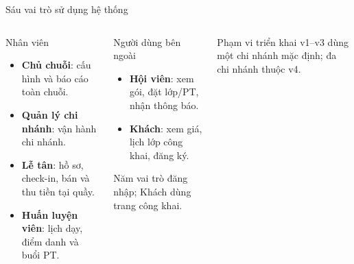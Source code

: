 \documentclass[aspectratio=169,10pt]{beamer}
\begin{document}
\begin{frame}{Sáu vai trò sử dụng hệ thống}
  \begin{columns}[T,onlytextwidth]
      \begin{block}{Nhân viên}
        \begin{itemize}
          \item \textbf{Chủ chuỗi}: cấu hình và báo cáo toàn chuỗi.
          \item \textbf{Quản lý chi nhánh}: vận hành chi nhánh.
          \item \textbf{Lễ tân}: hồ sơ, check-in, bán và thu tiền tại quầy.
          \item \textbf{Huấn luyện viên}: lịch dạy, điểm danh và buổi PT.
        \end{itemize}
      \end{block}
      \begin{block}{Người dùng bên ngoài}
        \begin{itemize}
          \item \textbf{Hội viên}: xem gói, đặt lớp/PT, nhận thông báo.
          \item \textbf{Khách}: xem giá, lịch lớp công khai, đăng ký.
        \end{itemize}
        Năm vai trò đăng nhập; Khách dùng trang công khai.
      \end{block}
      \begin{alertblock}{Phạm vi triển khai}
        v1--v3 dùng một chi nhánh mặc định; đa chi nhánh thuộc v4.
      \end{alertblock}
  \end{columns}
\end{frame}
\end{document}
